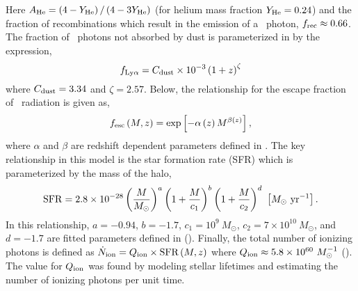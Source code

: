 Here $A_{\rm He} = \left(4 - Y_{\rm He} \right) / \left( 4 - 3 Y_{\rm He} \right)$ (for helium mass fraction $Y_{\rm He} = 0.24$) and
the fraction of recombinations which result in the emission of a \lya\ photon, $f_{\rm rec} \approx 0.66$.
The fraction of \lya\ photons not absorbed
by dust is parameterized in \cite{2011ApJ...730....8H} by the expression,
\begin{equation}
f_{\rm Ly\alpha} = C_{\rm dust} \times 10^{-3} \left( 1 + z\right)^{\zeta}
\end{equation}
where $C_{\rm dust} = 3.34$ and $\zeta = 2.57$. Below, the relationship for the
escape fraction of \lya\ radiation is given as,
\begin{equation}
f_{\rm esc} \left( M, z\right) = \exp \left[- \alpha \left(z \right) M^{\beta \left(z \right)} \right],
\end{equation}
where $\alpha$ and $\beta$ are redshift dependent parameters defined in \cite{2010ApJ...710.1239R}.
The key relationship in this model is the star formation rate (SFR)
which is parameterized by the mass of the halo,
\begin{equation}
  {\rm SFR} = 2.8 \times 10^{-28} \left(\frac{M}{M_{\odot}} \right)^a \left( 1 + \frac{M}{c_1}\right)^b \left(1 + \frac{M}{c_2} \right)^d \ \left[ M_{\odot} \ {\rm yr}^{-1} \right].
\end{equation}
In this relationship, $a = -0.94$, $b = -1.7$, $c_1 = 10^9 \ M_{\odot}$, $c_2 = 7 \times 10^{10} \ M_{\odot}$, and $d = -1.7$
are fitted parameters defined in (\cite{2013ApJ...763..132S}). Finally, the total number of ionizing photons is defined as $\dot{N}_{\rm ion} = Q_{\rm ion} \times \textrm{SFR} \left(M, z \right)$ where $Q_{\rm ion} \approx 5.8 \times 10^{60} \ M_{\odot}^{-1}$
(\cite{2002A&A...382...28S}). The value for $Q_{\rm ion}$ was found by modeling stellar
lifetimes and estimating the number of ionizing photons per unit time.

